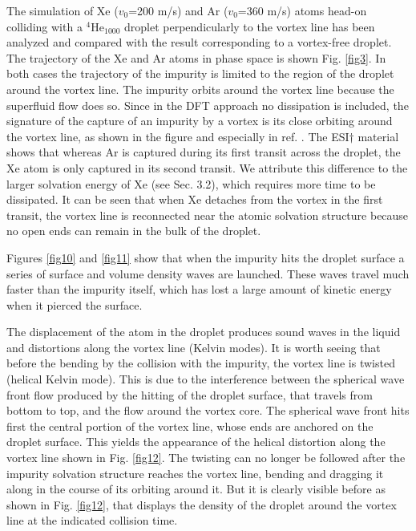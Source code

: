 The simulation of Xe ($v_0$=200 m/s) and Ar ($v_0$=360 m/s) atoms head-on colliding with a $^4$He$_{1000}$ droplet perpendicularly to the vortex line has been analyzed and
compared with the result corresponding to a vortex-free droplet. The trajectory of the Xe and Ar atoms in phase space is shown Fig. \ref{fig3}. In both cases the trajectory of the impurity
is limited to the region of the droplet around the vortex line. The impurity orbits around the vortex line because the superfluid flow does so. Since in the DFT approach
no dissipation is included, the signature of the capture of an impurity by a vortex is its close orbiting around the vortex line, as shown in the figure
and especially  in ref. \cite{ESI}. The ESI$\dag$ material shows that whereas Ar is captured during its first transit across the droplet, the Xe atom is only captured in its second transit. We attribute this difference 
to the larger solvation energy of Xe (see Sec. 3.2), which requires more time to be dissipated. It can be seen\cite{ESI} that when Xe detaches from the vortex  in the first
transit,   the  vortex line is reconnected near the atomic solvation structure because no open ends can remain in the bulk of the droplet.
  
Figures \ref{fig10} and \ref{fig11} show that
 when the impurity hits the droplet surface a series of surface and volume density waves are launched.
These waves travel  much faster than the impurity itself, 
which has lost a large amount of kinetic energy when it pierced the surface.

The displacement of the  atom in the droplet
produces sound waves in the liquid and distortions along the vortex line (Kelvin modes). 
It is worth seeing that before the bending by the collision with the impurity, the vortex line is twisted (helical Kelvin mode). 
  This  is due to the interference between the  spherical wave front flow
 produced by the hitting of the droplet surface, that travels from bottom to top, 
 and the  flow around the vortex core.
 The spherical wave front  hits first the central portion of the vortex line, whose ends are anchored on the droplet surface. This yields the appearance of the helical distortion
 along the vortex line shown in Fig. \ref{fig12}.
 The twisting  can no longer  be followed after the
 impurity solvation structure reaches the vortex line, bending and dragging it along in the course of its orbiting around it. But it is clearly visible before as shown in Fig. \ref{fig12}, that displays the
 density of the droplet around the vortex line at the indicated collision time. 

